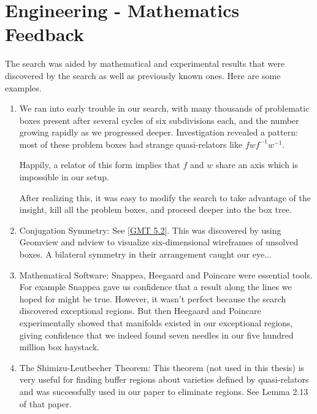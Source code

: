 \section{Engineering - Mathematics Feedback}
The search was aided
by mathematical and experimental results
that were discovered by the search
as well as previously known ones.
Here are some examples.
\begin{enumerate}
	\item 
		We ran into early trouble in our search, with many thousands
		of problematic boxes present after
		several cycles of six subdivisions each, and the number growing
		rapidly as we progressed deeper.
		Investigation revealed a pattern:
		most of these problem boxes had strange quasi-relators
		like $fwf^{-1}w^{-1}$.
		
		Happily, a relator of this form
		implies that $f$ and $w$ share an axis
		which is impossible in our setup.

		After realizing this, it was easy to modify the search to
		take advantage of the insight,
		kill all the problem boxes,
		and proceed deeper into the box tree.
	\item Conjugation Symmetry: See \ref{GMT 5.2}.
		This was discovered by using Geomview and ndview
		to visualize six-dimensional wireframes of unsolved boxes.
		A bilateral symmetry in their arrangement caught our eye...
		
	\item Mathematical Software:
		Snappea, Heegaard and Poincare were essential tools.
		For example Snappea gave us confidence that a result along the lines we hoped for might be true.
		However, it wasn't perfect because the search discovered exceptional regions.
		But then Heegaard and Poincare experimentally showed
		that manifolds existed in our exceptional regions,
		giving confidence
		that we indeed found seven needles in
		our five hundred million box haystack.

	\item The Shimizu-Leutbecher Theorem:
		This theorem (not used in this thesis) is very useful
		for finding buffer regions about varieties
		defined by quasi-relators
		and was successfully used in our paper \cite{GHMTY}
		to eliminate regions. See Lemma 2.13 of that paper.

\end{enumerate}

